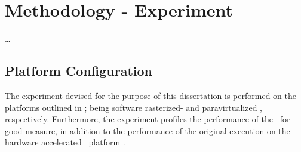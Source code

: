 
\chapter{Methodology - Experiment}
\label{cha:methodologyexperiment}
\ldots



\section{Platform Configuration}
\label{sec:methodologyexperiment_platformconfiguration}
The experiment devised for the purpose of this dissertation is performed on the platforms outlined in ; being software rasterized- and paravirtualized \dvttermsimics , respectively.
Furthermore, the experiment profiles the performance of the \dvttermreferencesolution\ for good measure, in addition to the performance of the original execution on the hardware accelerated \dvttermhost\ platform .

